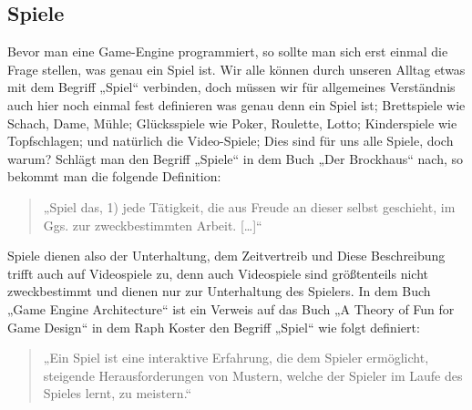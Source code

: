 \subsection{Spiele}	

Bevor man eine Game-Engine programmiert, so sollte man sich erst einmal die Frage stellen, was genau ein Spiel ist. Wir alle können durch unseren Alltag etwas mit dem Begriff „Spiel“ verbinden, doch müssen wir für allgemeines Verständnis auch hier noch einmal fest definieren was genau denn ein Spiel ist;
Brettspiele wie Schach, Dame, Mühle; Glücksspiele wie Poker, Roulette, Lotto; Kinderspiele wie Topfschlagen; und natürlich die Video-Spiele; Dies sind für uns alle Spiele, doch warum?
Schlägt man den Begriff „Spiele“ in dem Buch „Der Brockhaus“ nach, so bekommt man die folgende Definition:

\begin{quote}
	„Spiel das, 1) jede Tätigkeit, die aus Freude an dieser selbst geschieht, im Ggs. zur zweckbestimmten Arbeit. […]“ \cite{brockhaus}
\end{quote}

Spiele dienen also der Unterhaltung, dem Zeitvertreib und 
Diese Beschreibung trifft auch auf Videospiele zu, denn auch Videospiele sind größtenteils nicht zweckbestimmt und dienen nur zur Unterhaltung des Spielers.
In dem Buch „Game Engine Architecture“ \cite{gea} ist ein Verweis auf das Buch „A Theory
of Fun for Game Design“ in dem Raph Koster den Begriff „Spiel“ wie folgt definiert:

\begin{quote}
	„Ein Spiel ist eine interaktive Erfahrung, die dem Spieler ermöglicht, steigende Herausforderungen von Mustern, welche der Spieler im Laufe des Spieles lernt, zu meistern.“
	\cite{theoryoffun}
\end{quote}